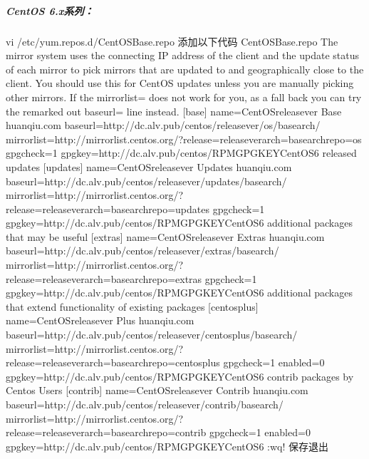 \documentclass[letterpaper,10pt,english]{sphinxmanual}
\begin{document}
\subparagraph{CentOS 6.x系列：}
\label{\detokenize{software_manage/yum/yum_official_sync:centos-6-x}}
%
\begin{sphinxVerbatim}[commandchars=\\\{\}]
vi /etc/yum.repos.d/CentOS\PYGZhy{}Base.repo \PYGZsh{}添加以下代码
\PYGZsh{} CentOS\PYGZhy{}Base.repo
\PYGZsh{}
\PYGZsh{} The mirror system uses the connecting IP address of the client and the
\PYGZsh{} update status of each mirror to pick mirrors that are updated to and
\PYGZsh{} geographically close to the client. You should use this for CentOS updates
\PYGZsh{} unless you are manually picking other mirrors.
\PYGZsh{}
\PYGZsh{} If the mirrorlist= does not work for you, as a fall back you can try the
\PYGZsh{} remarked out baseurl= line instead.
\PYGZsh{}
\PYGZsh{}
[base]
name=CentOS\PYGZhy{}\PYGZdl{}releasever \PYGZhy{} Base \PYGZhy{} huanqiu.com
baseurl=http://dc.alv.pub/centos/\PYGZdl{}releasever/os/\PYGZdl{}basearch/
\PYGZsh{}mirrorlist=http://mirrorlist.centos.org/?release=\PYGZdl{}releasever\PYGZam{}arch=\PYGZdl{}basearch\PYGZam{}repo=os
gpgcheck=1
gpgkey=http://dc.alv.pub/centos/RPM\PYGZhy{}GPG\PYGZhy{}KEY\PYGZhy{}CentOS\PYGZhy{}6
\PYGZsh{}released updates
[updates]
name=CentOS\PYGZhy{}\PYGZdl{}releasever \PYGZhy{} Updates \PYGZhy{} huanqiu.com
baseurl=http://dc.alv.pub/centos/\PYGZdl{}releasever/updates/\PYGZdl{}basearch/
\PYGZsh{}mirrorlist=http://mirrorlist.centos.org/?release=\PYGZdl{}releasever\PYGZam{}arch=\PYGZdl{}basearch\PYGZam{}repo=updates
gpgcheck=1
gpgkey=http://dc.alv.pub/centos/RPM\PYGZhy{}GPG\PYGZhy{}KEY\PYGZhy{}CentOS\PYGZhy{}6
\PYGZsh{}additional packages that may be useful
[extras]
name=CentOS\PYGZhy{}\PYGZdl{}releasever \PYGZhy{} Extras \PYGZhy{} huanqiu.com
baseurl=http://dc.alv.pub/centos/\PYGZdl{}releasever/extras/\PYGZdl{}basearch/
\PYGZsh{}mirrorlist=http://mirrorlist.centos.org/?release=\PYGZdl{}releasever\PYGZam{}arch=\PYGZdl{}basearch\PYGZam{}repo=extras
gpgcheck=1
gpgkey=http://dc.alv.pub/centos/RPM\PYGZhy{}GPG\PYGZhy{}KEY\PYGZhy{}CentOS\PYGZhy{}6
\PYGZsh{}additional packages that extend functionality of existing packages
[centosplus]
name=CentOS\PYGZhy{}\PYGZdl{}releasever \PYGZhy{} Plus \PYGZhy{} huanqiu.com
baseurl=http://dc.alv.pub/centos/\PYGZdl{}releasever/centosplus/\PYGZdl{}basearch/
\PYGZsh{}mirrorlist=http://mirrorlist.centos.org/?release=\PYGZdl{}releasever\PYGZam{}arch=\PYGZdl{}basearch\PYGZam{}repo=centosplus
gpgcheck=1
enabled=0
gpgkey=http://dc.alv.pub/centos/RPM\PYGZhy{}GPG\PYGZhy{}KEY\PYGZhy{}CentOS\PYGZhy{}6
\PYGZsh{}contrib \PYGZhy{} packages by Centos Users
[contrib]
name=CentOS\PYGZhy{}\PYGZdl{}releasever \PYGZhy{} Contrib \PYGZhy{} huanqiu.com
baseurl=http://dc.alv.pub/centos/\PYGZdl{}releasever/contrib/\PYGZdl{}basearch/
\PYGZsh{}mirrorlist=http://mirrorlist.centos.org/?release=\PYGZdl{}releasever\PYGZam{}arch=\PYGZdl{}basearch\PYGZam{}repo=contrib
gpgcheck=1
enabled=0
gpgkey=http://dc.alv.pub/centos/RPM\PYGZhy{}GPG\PYGZhy{}KEY\PYGZhy{}CentOS\PYGZhy{}6
:wq! \PYGZsh{}保存退出
\end{sphinxVerbatim}
\end{document}

